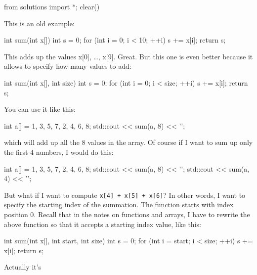 \begin{python0}
from solutions import *; clear()
\end{python0}

This is an old example:

\begin{consolethree}[escapeinside=||]
int sum(int x[])
{
    int s = 0;
    for (int i = 0; i < 10; ++i)
    {
        s += x[i];
    }
    return s;
}
\end{consolethree}

This adds up the values x[0], \ldots, x[9]. Great. But this one is even better because it allows to specify how many values to add:

\begin{consolethree}[escapeinside=||]
int sum(int x[], int size)
{
    int s = 0;
    for (int i = 0; i < size; ++i)
    {
        s += x[i];
    }
    return s;
}
\end{consolethree}

You can use it like this:

\begin{consolethree}[escapeinside=||]
int a[] = {1, 3, 5, 7, 2, 4, 6, 8};
std::cout << sum(a, 8) << '\n';
\end{consolethree}

which will add up all the 8 values in the array. Of course if I want to sum up only the first 4 numbers, I would do this:

\begin{consolethree}[escapeinside=||]
int a[] = {1, 3, 5, 7, 2, 4, 6, 8};
std::cout << sum(a, 8) << '\n';
std::cout << sum(a, 4) << '\n';
\end{consolethree}

But what if I want to compute \texttt{x[4] + x[5] + x[6]}? In other words, I want to specify the starting index of the summation. The function starts with index position 0. Recall that in the notes on functions and arrays, I have to rewrite the above function so that it accepts a starting index value, like this:

\begin{consolethree}[escapeinside=||]
int sum(int x[], int start, int size)
{
    int s = 0;
    for (int i = start; i < size; ++i)
    {
        s += x[i];
    }
    return s;
}
\end{consolethree}

Actually it's 

